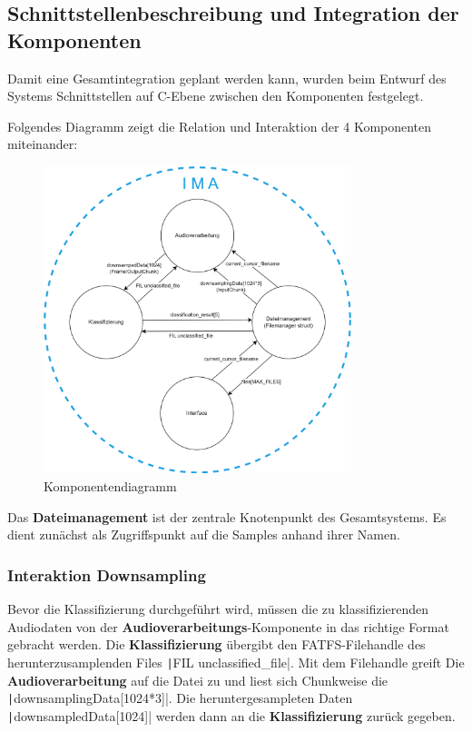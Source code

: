 \newpage

\subsection{Schnittstellenbeschreibung und Integration der Komponenten}\label{sec:schnittstellenbeschreibung-und-integration-der-komponenten}

Damit eine Gesamtintegration geplant werden kann, wurden beim Entwurf des Systems Schnittstellen auf C-Ebene zwischen den Komponenten festgelegt.

Folgendes Diagramm zeigt die Relation und Interaktion der 4 Komponenten miteinander:


\begin{figure}[H]
   	\centering
   	\includegraphics[width=0.8\textwidth]{images/04_spezifikation/komponentendiagramm.drawio.png}
   	\caption{Komponentendiagramm}
   	\label{fig:komponentendiagramm}
\end{figure}

Das \textbf{Dateimanagement} ist der zentrale Knotenpunkt des Gesamtsystems. Es dient zunächst als Zugriffspunkt auf die Samples anhand ihrer Namen. 

\subsubsection{Interaktion Downsampling} 

Bevor die Klassifizierung durchgeführt wird, müssen die zu klassifizierenden Audiodaten von der \textbf{Audioverarbeitungs}-Komponente in das richtige Format gebracht werden.
Die \textbf{Klassifizierung} übergibt den FATFS-Filehandle des herunterzusamplenden Files \texttt|FIL unclassified_file|. Mit dem Filehandle greift Die \textbf{Audioverarbeitung} auf die Datei zu und liest sich Chunkweise die \texttt|downsamplingData[1024*3]|. Die heruntergesampleten Daten \texttt|downsampledData[1024]| werden dann an die \textbf{Klassifizierung} zurück gegeben.

